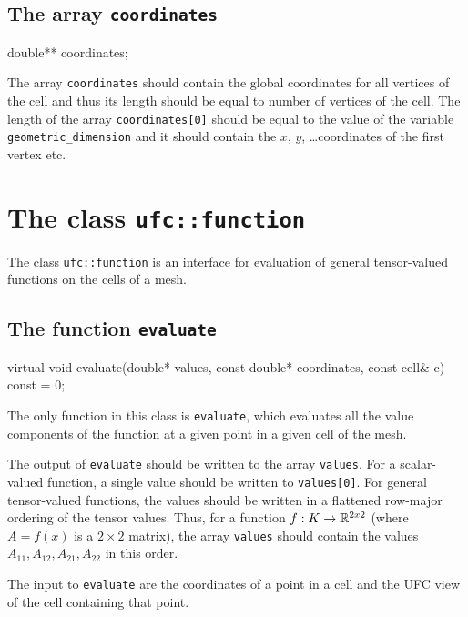 \subsection{The array \texttt{coordinates}}

\begin{code}
double** coordinates;
\end{code}

The array \texttt{coordinates} should contain the global coordinates
for all vertices of the cell and thus its length should be equal to
number of vertices of the cell. The length of the array
\texttt{coordinates[0]} should be equal to the value of the variable
\texttt{geometric\_dimension} and it should contain the $x$, $y$,
\ldots coordinates of the first vertex etc.

\section{The class \texttt{ufc::function}}

The class \texttt{ufc::function} is an interface for evaluation of
general tensor-valued functions on the cells of a mesh.

\subsection{The function \texttt{evaluate}}

\begin{code}
virtual void evaluate(double* values,
                      const double* coordinates,
                      const cell& c) const = 0;
\end{code}

The only function in this class is \texttt{evaluate}, which evaluates
all the value components of the function at a given point in a given
cell of the mesh.

The output of \texttt{evaluate} should be written to the array
\texttt{values}. For a scalar-valued function, a single value should be
written to \texttt{values[0]}. For general tensor-valued functions,
the values should be written in a flattened row-major ordering of the
tensor values. Thus, for a function $f : K \rightarrow \mathbb{R}^{2x2}$ (where $A =
f(x)$ is a $2 \times 2$ matrix), the array \texttt{values} should contain
the values $A_{11}, A_{12}, A_{21}, A_{22}$ in this order.

The input to \texttt{evaluate} are the coordinates of a point in a cell
and the UFC view of the cell containing that point.

